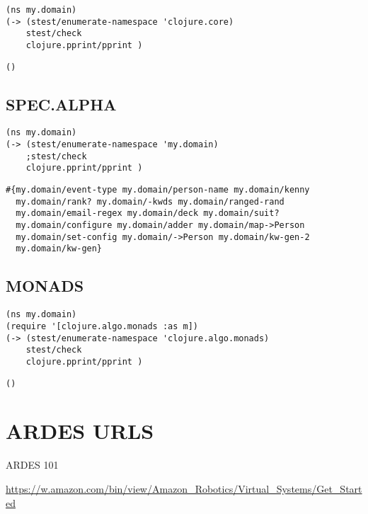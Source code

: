 \documentclass[10pt,oneside,x11names]{article}
\begin{document}
\begin{verbatim}
(ns my.domain)
(-> (stest/enumerate-namespace 'clojure.core)
    stest/check
    clojure.pprint/pprint )
\end{verbatim}

\begin{verbatim}
()
\end{verbatim}

\subsection{SPEC.ALPHA}
\label{sec:org9f4ea53}

\begin{verbatim}
(ns my.domain)
(-> (stest/enumerate-namespace 'my.domain)
    ;stest/check
    clojure.pprint/pprint )
\end{verbatim}

\begin{verbatim}
#{my.domain/event-type my.domain/person-name my.domain/kenny
  my.domain/rank? my.domain/-kwds my.domain/ranged-rand
  my.domain/email-regex my.domain/deck my.domain/suit?
  my.domain/configure my.domain/adder my.domain/map->Person
  my.domain/set-config my.domain/->Person my.domain/kw-gen-2
  my.domain/kw-gen}
\end{verbatim}

\subsection{MONADS}
\label{sec:orge3d42a9}

\begin{verbatim}
(ns my.domain)
(require '[clojure.algo.monads :as m])
(-> (stest/enumerate-namespace 'clojure.algo.monads)
    stest/check
    clojure.pprint/pprint )
\end{verbatim}

\begin{verbatim}
()
\end{verbatim}


\section{ARDES URLS}
\label{sec:org7e03dea}
\label{sec:urls}

\begin{description}
\item[{ARDES 101}] \mbox{}
\end{description}
\url{https://w.amazon.com/bin/view/Amazon\_Robotics/Virtual\_Systems/Get\_Started}
\end{document}
